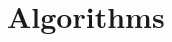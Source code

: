 \documentclass{article}
\let\oldref\ref
\renewcommand{\ref}[1]{(\oldref{#1})}
\begin{document}











\section{Algorithms}
\end{document}
